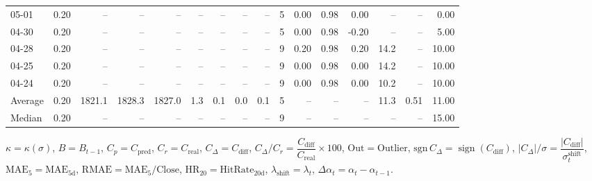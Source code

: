 \begin{threeparttable}
{\begin{tabular}{lrrrrrrrrrrrrrrr}
  05-01 &     0.20 &     -- &     -- &     -- &         -- &             -- &                       -- &                  -- &              5 &       0.00 &      0.98 &           0.00 &               -- &              -- &                   0.00 \\
  04-30 &     0.20 &     -- &     -- &     -- &         -- &             -- &                       -- &                  -- &              5 &       0.00 &      0.98 &          -0.20 &               -- &              -- &                   5.00 \\
  04-28 &     0.20 &     -- &     -- &     -- &         -- &             -- &                       -- &                  -- &              9 &       0.20 &      0.98 &           0.20 &             14.2 &              -- &                  10.00 \\
  04-25 &     0.20 &     -- &     -- &     -- &         -- &             -- &                       -- &                  -- &              9 &       0.00 &      0.98 &           0.00 &             14.2 &              -- &                  10.00 \\
  04-24 &     0.20 &     -- &     -- &     -- &         -- &             -- &                       -- &                  -- &              9 &       0.00 &      0.98 &           0.00 &             10.2 &              -- &                  10.00 \\
Average &     0.20 & 1821.1 & 1828.3 & 1827.0 &        1.3 &            0.1 &                      0.0 &                 0.1 &              5 &         -- &        -- &             -- &             11.3 &            0.51 &                  11.00 \\
 Median &     0.20 &     -- &     -- &     -- &         -- &             -- &                       -- &                  -- &              9 &         -- &        -- &             -- &               -- &              -- &                  15.00 \\
\bottomrule
\end{tabular}
}
\begin{tablenotes}\footnotesize
\item $\kappa=\kappa(\sigma)$, $B=B_{t-1}$, $C_p=C_{\text{pred}}$, $C_r=C_{\text{real}}$, $C_\Delta=C_{\text{diff}}$, $C_\Delta/C_r=\dfrac{C_{\text{diff}}}{C_{\text{real}}}\times100$, $\mathrm{Out}=\text{Outlier}$, $\mathrm{sgn}\,C_\Delta=\operatorname{sign}(C_{\text{diff}})$, $|C_\Delta|/\sigma=\dfrac{|C_{\text{diff}}|}{\sigma_t^{\text{shift}}}$, $\mathrm{MAE}_5=\mathrm{MAE}_{5\text{d}}$, $\mathrm{RMAE}= \mathrm{MAE}_5 / \text{Close}$, $\mathrm{HR}_{20}=\mathrm{HitRate}_{20\text{d}}$, 
$\lambda_{\text{shift}}=\lambda_t$, 
$\Delta\alpha_t=\alpha_t-\alpha_{t-1}$.
\end{tablenotes}
\end{threeparttable}
\endgroup

